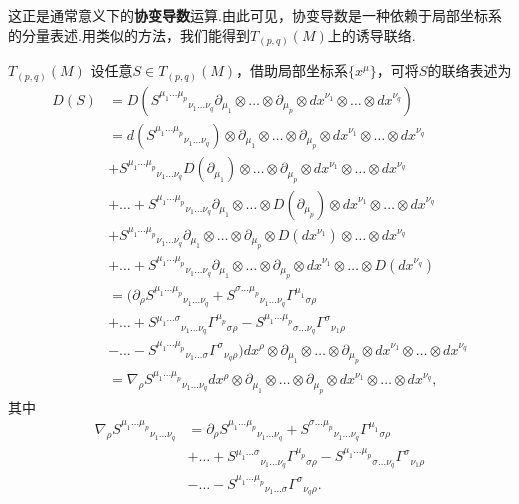 \documentclass[10pt]{article}
\begin{document}
	这正是通常意义下的\textbf{协变导数}运算.由此可见，协变导数是一种依赖于局部坐标系的分量表述.用类似的方法，我们能得到$T_{(p,q)}(M)$上的诱导联络.
	\begin{definition}
		$T_{(p,q)}(M)$
		设任意$S\in T_{(p,q)}(M)$，借助局部坐标系$\{x^\mu\}$，可将$S$的联络表述为
		\begin{equation}
			\begin{split}
				D(S)&=D({S^{\mu_1\dots\mu_p}}_{\nu_1\dots\nu_q}\partial_{\mu_1}\otimes\dots\otimes\partial_{\mu_p}\otimes{dx}^{\nu_1}\otimes\dots\otimes{dx}^{\nu_q})\\
				&=d({S^{\mu_1\dots\mu_p}}_{\nu_1\dots\nu_q})\otimes\partial_{\mu_1}\otimes\dots\otimes\partial_{\mu_p}\otimes{dx}^{\nu_1}\otimes\dots\otimes{dx}^{\nu_q}\\
				&+{S^{\mu_1\dots\mu_p}}_{\nu_1\dots\nu_q}D(\partial_{\mu_1})\otimes\dots\otimes\partial_{\mu_p}\otimes{dx}^{\nu_1}\otimes\dots\otimes{dx}^{\nu_q}\\
				&+\dots+{S^{\mu_1\dots\mu_p}}_{\nu_1\dots\nu_q}\partial_{\mu_1}\otimes\dots\otimes D({\partial_{\mu_p}})\otimes{dx}^{\nu_1}\otimes\dots\otimes{dx}^{\nu_q}\\
				&+{S^{\mu_1\dots\mu_p}}_{\nu_1\dots\nu_q}\partial_{\mu_1}\otimes\dots\otimes{\partial_{\mu_p}}\otimes D({dx}^{\nu_1})\otimes\dots\otimes{dx}^{\nu_q}\\
				&+\dots+{S^{\mu_1\dots\mu_p}}_{\nu_1\dots\nu_q}\partial_{\mu_1}\otimes\dots\otimes{\partial_{\mu_p}}\otimes{dx}^{\nu_1}\otimes\dots\otimes D({dx}^{\nu_q})\\
				&=(\partial_\rho{S^{\mu_1\dots\mu_p}}_{\nu_1\dots\nu_q}+{S^{\sigma\dots\mu_p}}_{\nu_1\dots\nu_q}{\Gamma^{\mu_1}}_{\sigma\rho}\\
				&+\dots+{S^{\mu_1\dots\sigma}}_{\nu_1\dots\nu_q}{\Gamma^{\mu_p}}_{\sigma\rho}-{S^{\mu_1\dots\mu_p}}_{\sigma\dots\nu_q}{\Gamma^{\sigma}}_{\nu_1\rho}\\
				&-\dots-{S^{\mu_1\dots\mu_p}}_{\nu_1\dots\sigma}{\Gamma^{\sigma}}_{\nu_q\rho})dx^\rho\otimes\partial_{\mu_1}\otimes\dots\otimes\partial_{\mu_p}\otimes{dx}^{\nu_1}\otimes\dots\otimes{dx}^{\nu_q}\\
				&=\nabla_{\rho}{S^{\mu_1\dots\mu_p}}_{\nu_1\dots\nu_q}dx^\rho\otimes\partial_{\mu_1}\otimes\dots\otimes\partial_{\mu_p}\otimes{dx}^{\nu_1}\otimes\dots\otimes{dx}^{\nu_q},
			\end{split}		
		\end{equation}
		其中
		\begin{equation}
			\begin{split}
				\nabla_{\rho}{S^{\mu_1\dots\mu_p}}_{\nu_1\dots\nu_q}&=\partial_\rho{S^{\mu_1\dots\mu_p}}_{\nu_1\dots\nu_q}+{S^{\sigma\dots\mu_p}}_{\nu_1\dots\nu_q}{\Gamma^{\mu_1}}_{\sigma\rho}\\
				&+\dots+{S^{\mu_1\dots\sigma}}_{\nu_1\dots\nu_q}{\Gamma^{\mu_p}}_{\sigma\rho}-{S^{\mu_1\dots\mu_p}}_{\sigma\dots\nu_q}{\Gamma^{\sigma}}_{\nu_1\rho}\\
				&-\dots-{S^{\mu_1\dots\mu_p}}_{\nu_1\dots\sigma}{\Gamma^{\sigma}}_{\nu_q\rho}.
			\end{split}		
		\end{equation}
	\end{definition}
\end{document}
